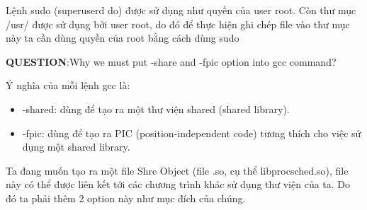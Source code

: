 \vspace{0.2cm}

Lệnh sudo (superuserd do) được sử dụng như quyền của user root.
Còn thư mục /usr/ được sử dụng bởi user root, do đó để thực hiện ghi chép file vào thư mục này ta cần dùng quyền của root bằng cách dùng sudo

\vspace{0.3cm}

\textbf{QUESTION}:Why we must put -share and -fpic option into gcc command?

\vspace{0.2cm}

Ý nghĩa của mỗi lệnh gcc là:

\begin{itemize}
	\item -shared: dùng để tạo ra một thư viện shared (shared library).
	\item -fpic: dùng để tạo ra PIC (position-independent code) tương thích cho việc sử dụng một shared library.
\end{itemize}

Ta đang muốn tạo ra một file Shre Object (file .so, cụ thể libprocsched.so), file này có thể được liên kết tới các chương trình khác sử dụng thư viện của ta. Do đó ta phải thêm 2 option này như mục đích của chúng.
